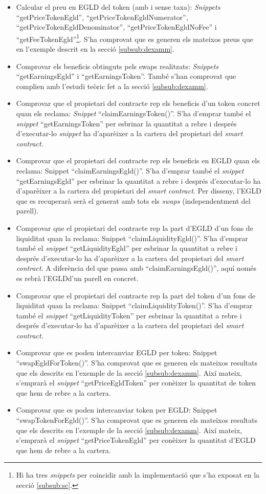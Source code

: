 \documentclass[11pt,a4paper]{article}
\begin{document}
\begin{itemize}
\item Calcular el preu en EGLD del token (amb i sense taxa): \textit{Snippets} ``getPriceTokenEgld'', ``getPriceTokenEgldNumerator'', ``getPriceTokenEgldDenominator'', ``getPriceTokenEgldNoFee'' i ``getFeeTokenEgld''\footnote{Hi ha tres \textit{snippets} per coincidir amb la implementació que s'ha exposat en la secció \ref{subsub:sc}.}. S'ha comprovat que es generen els mateixos preus que en l'exemple descrit en la secció \ref{subsub:dexamm}.
\item Comprovar els beneficis obtinguts pels swaps realitzats: \textit{Snippets} ``getEarningsEgld'' i ``getEarningsToken''. També s'han comprovat que complien amb l'estudi teòric fet a la secció \ref{subsub:dexamm}.
\item Comprovar que el propietari del contracte rep els beneficis d'un token concret quan els reclama: \textit{Snippet} ``claimEarningsToken()''. S'ha d'emprar també el \textit{snippet} ``getEarningsToken'' per esbrinar la quantitat a rebre i després d'executar-lo \textit{snippet} ha d'aparèixer a la cartera del propietari del \textit{smart contract}.
\item  Comprovar que el propietari del contracte rep els beneficis en EGLD quan els reclama: {Snippet} ``claimEarningsEgld()''. S'ha d'emprar també el \textit{snippet} ``getEarningsEgld'' per esbrinar la quantitat a rebre i després d'executar-lo ha d'aparèixer a la cartera del propietari del \textit{smart contract}. Per disseny, l'EGLD que es recuperarà serà el generat amb tots els \textit{swaps} (independentment del parell).
\item  Comprovar que el propietari del contracte rep la part d'EGLD d'un fons de liquiditat quan la reclama: {Snippet} ``claimLiquidityEgld()''. S'ha d'emprar també el \textit{snippet} ``getLiquidityEgld'' per esbrinar la quantitat a rebre i després d'executar-lo ha d'aparèixer a la cartera del propietari del \textit{smart contract}. A diferència del que passa amb ``claimEarningsEgld()'', aquí només es rebrà l'EGLDd'un parell en concret. 
\item  Comprovar que el propietari del contracte rep la part del token d'un fons de liquiditat quan la reclama: {Snippet} ``claimLiquidityToken()''. S'ha d'emprar també el \textit{snippet} ``getLiquidityToken'' per esbrinar la quantitat a rebre i després d'executar-lo ha d'aparèixer a la cartera del propietari del \textit{smart contract}.
\item Comprovar que es poden intercanviar EGLD per token: {Snippet} ``swapEgldForToken()''. S'ha comprovat que es generen els mateixos resultats que els descrits en l'exemple de la secció \ref{subsub:dexamm}. Així mateix, s'emprarà el \textit{snippet} ``getPriceEgldToken'' per conèixer la quantitat de token que hem de rebre a la cartera.
\item Comprovar que es poden intercanviar token per EGLD: {Snippet} ``swapTokenForEgld()''. S'ha comprovat que es generen els mateixos resultats que els descrits en l'exemple de la secció \ref{subsub:dexamm}. Així mateix, s'emprarà el \textit{snippet} ``getPriceTokenEgld'' per conèixer la quantitat d'EGLD que hem de rebre a la cartera.
\end{itemize}
\end{document}
